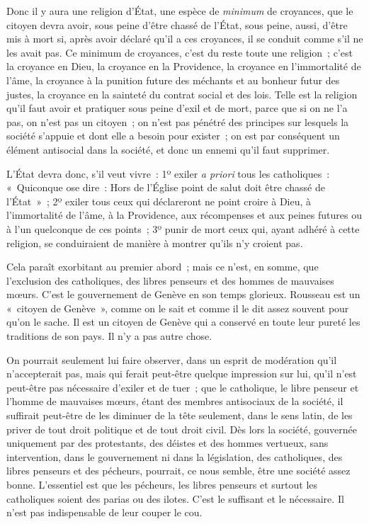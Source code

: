 \documentclass[french,twoside]{book} %
\begin{document}
Donc il y aura une religion d’État, une espèce de {\itshape minimum} de croyances, que le citoyen devra avoir, sous peine d’être chassé de l’État, sous peine, aussi, d’être mis à mort si, après avoir déclaré qu’il a ces croyances, il se conduit comme s’il ne les avait pas. Ce minimum de croyances, c’est du reste toute une religion ; c’est la croyance en Dieu, la croyance en la Providence, la croyance en  l’immortalité de l’âme, la croyance à la punition future des méchants et au bonheur futur des justes, la croyance en la sainteté du contrat social et des lois. Telle est la religion qu’il faut avoir et pratiquer sous peine d’exil et de mort, parce que si on ne l’a pas, on n’est pas un citoyen ; on n’est pas pénétré des principes sur lesquels la société s’appuie et dont elle a besoin pour exister ; on est par conséquent un élément antisocial dans la société, et donc un ennemi qu’il faut supprimer.\par
L’État devra donc, s’il veut vivre : 1º exiler {\itshape a priori} tous les catholiques : « Quiconque ose dire : Hors de l’Église point de salut doit être chassé de l’État » ; 2º exiler tous ceux qui déclareront ne point croire à Dieu, à l’immortalité de l’âme, à la Providence, aux récompenses et aux peines futures ou à l’un quelconque de ces points ; 3º punir de mort ceux qui, ayant adhéré à cette religion, se conduiraient de manière à montrer qu’ils n’y croient pas.\par
Cela paraît exorbitant au premier abord ; mais ce n’est, en somme, que l’exclusion des catholiques, des libres penseurs et des hommes de mauvaises mœurs. C’est le gouvernement de Genève en son temps glorieux. Rousseau est un « citoyen de Genève », comme on le sait et comme il le dit assez  souvent pour qu’on le sache. Il est un citoyen de Genève qui a conservé en toute leur pureté les traditions de son pays. Il n’y a pas autre chose.\par
On pourrait seulement lui faire observer, dans un esprit de modération qu’il n’accepterait pas, mais qui ferait peut-être quelque impression sur lui, qu’il n’est peut-être pas nécessaire d’exiler et de tuer ; que le catholique, le libre penseur et l’homme de mauvaises mœurs, étant des membres antisociaux de la société, il suffirait peut-être de les diminuer de la tête seulement, dans le sens latin, de les priver de tout droit politique et de tout droit civil. Dès lors la société, gouvernée uniquement par des protestants, des déistes et des hommes vertueux, sans intervention, dans le gouvernement ni dans la législation, des catholiques, des libres penseurs et des pécheurs, pourrait, ce nous semble, être une société assez bonne. L’essentiel est que les pécheurs, les libres penseurs et surtout les catholiques soient des parias ou des ilotes. C’est le suffisant et le nécessaire. Il n’est pas indispensable de leur couper le cou.\par
\end{document}
